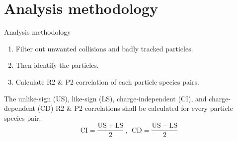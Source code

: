 \documentclass{beamer}
\begin{document}
\section{Analysis methodology}
\begin{frame}{Analysis methodology}
	\begin{enumerate}
		\item Filter out unwanted collisions and badly tracked particles.
		\item Then identify the particles.
		\item Calculate R2 \& P2 correlation of each particle species pairs.
	\end{enumerate}
\vspace*{0.5in}
	The unlike-sign (US), like-sign (LS), charge-independent (CI), and charge-dependent (CD) R2 \& P2 correlations shall be calculated for every particle species pair.
	\[\mathrm{CI}=\frac{\mathrm{US}+\mathrm{LS}}{2}\ , \ \ \mathrm{CD}=\frac{\mathrm{US}-\mathrm{LS}}{2}\]
	
\end{frame}
\end{document}
